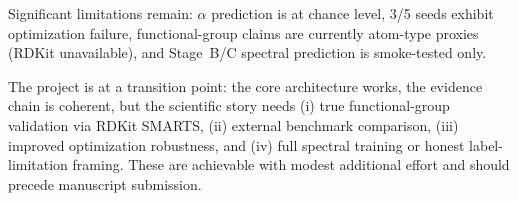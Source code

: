 \documentclass[11pt,a4paper]{article}
\begin{document}
Significant limitations remain: $\alpha$ prediction is at chance level, 3/5 seeds exhibit optimization failure, functional-group claims are currently atom-type proxies (RDKit unavailable), and Stage~B/C spectral prediction is smoke-tested only.

The project is at a transition point: the core architecture works, the evidence chain is coherent, but the scientific story needs (i) true functional-group validation via RDKit SMARTS, (ii) external benchmark comparison, (iii) improved optimization robustness, and (iv) full spectral training or honest label-limitation framing. These are achievable with modest additional effort and should precede manuscript submission.
\end{document}
